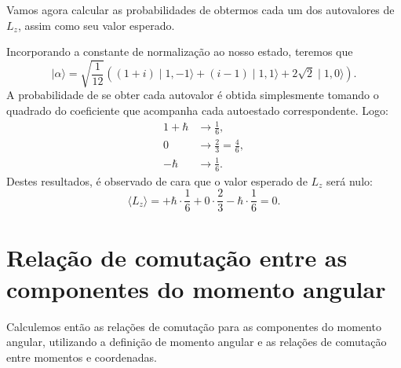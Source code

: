 \documentclass{article}
\newcommand{\ket}[1]{\mid\!\! #1 \rangle}
\begin{document}
Vamos agora calcular as probabilidades de obtermos cada um dos autovalores de $L_z$, assim como seu valor esperado.

Incorporando a constante de normalização ao nosso estado, teremos que
\begin{equation}
 \ket{\alpha} = \sqrt{\frac{1}{12}}\left((1 + i) \ket{1,-1} + (i - 1) \ket{1,1} +
 2\sqrt{2} \ket{1,0}\right)\mathrm{.}
\end{equation}
A probabilidade de se obter cada autovalor é obtida simplesmente tomando o quadrado do coeficiente que acompanha cada autoestado correspondente. Logo:
\begin{alignat}{1}
 +\hbar &\to \frac{1}{6} \mathrm{,}\\
 0 &\to \frac{2}{3} = \frac{4}{6} \mathrm{,}\\
 -\hbar &\to \frac{1}{6} \mathrm{.}
\end{alignat}
Destes resultados, é observado de cara que o valor esperado de $L_z$ será nulo:
\begin{equation}
 \langle L_z \rangle = +\hbar \cdot \frac{1}{6} + 0 \cdot \frac{2}{3} -\hbar \cdot \frac{1}{6} = 0\mathrm{.}
\end{equation}

\section{Relação de comutação entre as componentes do momento angular}
Calculemos então as relações de comutação para as componentes do momento angular, utilizando a definição de momento angular e as relações de comutação
entre momentos e coordenadas.
\end{document}
